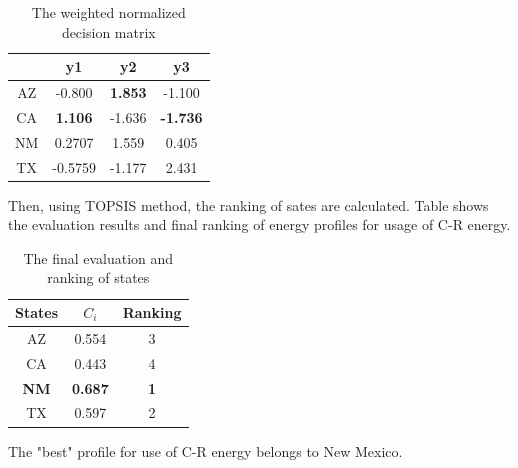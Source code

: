 \documentclass{mcmthesis}
\begin{document}
      \begin{table}
      \centering
      \begin{tabular}{cccc}
      \hline
      {}&{y1}&{y2}&{y3}\\
      \hline
      {AZ}&-0.800&\textbf{1.853}&-1.100\\
      \hline
      {CA}&\textbf{1.106}&-1.636&\textbf{-1.736}\\
      \hline
      {NM}&0.2707&1.559&0.405\\
      \hline
      {TX}&-0.5759&-1.177&2.431\\
      \hline
      \end{tabular}
      \caption{The weighted normalized decision matrix}
      \end{table}

      Then, using TOPSIS method, the ranking of sates are calculated. Table shows the evaluation results and final ranking of energy profiles for usage of C-R energy.

      \begin{table}
      \begin{tabular}{ccc}
      \hline
      {States}&{$C_i$}&{Ranking}\\
      \hline
      {AZ}&0.554&3\\
      \hline
      {CA}&0.443&4\\
      \hline
      \textbf{NM}&\textbf{0.687}&\textbf{1}\\
      \hline
      {TX}&0.597&2\\
      \hline

      \end{tabular}
      \caption{The final evaluation and ranking of states}
      \end{table}

      The "best" profile for use of C-R energy  belongs to New Mexico.
\end{document}
